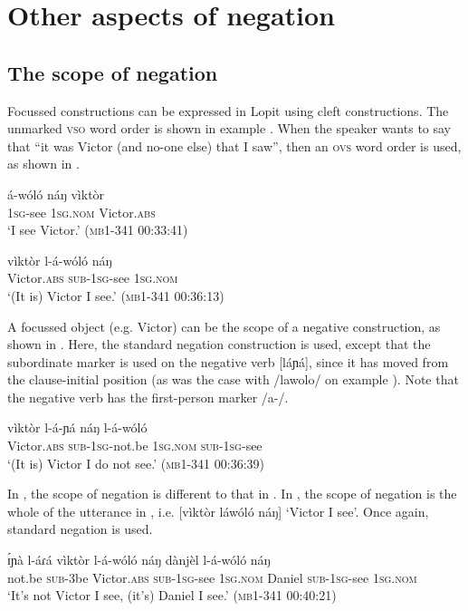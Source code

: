 \documentclass[output=paper,colorlinks,citecolor=brown,draftmode]{langscibook}
\begin{document}
\section{Other aspects of negation} \label{sec:lop:4}
\subsection{The scope of negation}
\label{sec:lop:4.1}
Focussed constructions can be expressed in Lopit using cleft constructions. The unmarked \textsc{vso} word order is shown in example .  When the speaker wants to say that “it was Victor (and no-one else) that I saw”, then an \textsc{ovs} word order is used, as shown in .

\ea\label{ex:lop:90}
        \gll á-wóló náŋ vìktòr \\ 
             1\textsc{sg-}see \textsc{1sg.nom} Victor.\textsc{abs} \\
        \glt ‘I see Victor.’ (\textsc{mb1-341} 00:33:41)
\z

\ea\label{ex:lop:91}
        \gll vìktòr l-á-wóló náŋ \\ 
             Victor.\textsc{abs} \textsc{sub-}1\textsc{sg-}see \textsc{1sg.nom} \\
        \glt ‘(It is) Victor I see.’ (\textsc{mb1-341} 00:36:13)
\z

A focussed object (e.g. Victor) can be the scope of a negative construction, as shown in . Here, the standard negation construction is used, except that the subordinate marker is used on the negative verb [láɲá], since it has moved from the clause-initial position (as was the case with /lawolo/ on example ). Note that the negative verb has the first-person marker /a-/.

\ea\label{ex:lop:92}
        \gll vìktòr l-á-ɲá náŋ l-á-wóló \\ 
             Victor.\textsc{abs} \textsc{sub-1sg-}not.be \textsc{1sg.nom} \textsc{sub-}1\textsc{sg-}see \\
        \glt ‘(It is) Victor I do not see.’ (\textsc{mb1-341} 00:36:39)
\z

In , the scope of negation is different to that in . In , the scope of negation is the whole of the utterance in , i.e. [vìktòr láwóló náŋ] ‘Victor I see’. Once again, standard negation is used.

\ea\label{ex:lop:93}
        \gll ɪ́ɲà l-áɾá vìktòr l-á-wóló náŋ dànjèl l-á-wóló náŋ \\ 
             not.be \textsc{sub}{}-3be Victor.\textsc{abs} \textsc{sub-}1\textsc{sg-}see \textsc{1sg.nom} Daniel  \textsc{sub-}1\textsc{sg-}see \textsc{1sg.nom} \\
        \glt ‘It’s not Victor I see, (it’s) Daniel I see.’ (\textsc{mb1-341} 00:40:21)
\z
\end{document}

